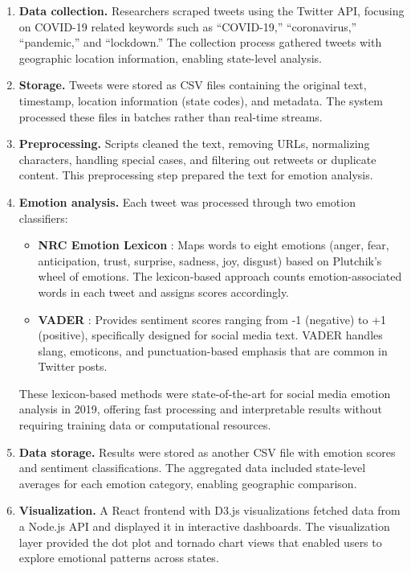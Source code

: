 \begin{enumerate}
\item \textbf{Data collection.} Researchers scraped tweets using the Twitter API, focusing on COVID-19 related keywords such as ``COVID-19,'' ``coronavirus,'' ``pandemic,'' and ``lockdown.'' The collection process gathered tweets with geographic location information, enabling state-level analysis.

\item \textbf{Storage.} Tweets were stored as CSV files containing the original text, timestamp, location information (state codes), and metadata. The system processed these files in batches rather than real-time streams.

\item \textbf{Preprocessing.} Scripts cleaned the text, removing URLs, normalizing characters, handling special cases, and filtering out retweets or duplicate content. This preprocessing step prepared the text for emotion analysis.

\item \textbf{Emotion analysis.} Each tweet was processed through two emotion classifiers:
\begin{itemize}
\item \textbf{NRC Emotion Lexicon} \cite{mohammad2013nrc}: Maps words to eight emotions (anger, fear, anticipation, trust, surprise, sadness, joy, disgust) based on Plutchik's wheel of emotions. The lexicon-based approach counts emotion-associated words in each tweet and assigns scores accordingly.
\item \textbf{VADER} \cite{hutto2014vader}: Provides sentiment scores ranging from -1 (negative) to +1 (positive), specifically designed for social media text. VADER handles slang, emoticons, and punctuation-based emphasis that are common in Twitter posts.
\end{itemize}

These lexicon-based methods were state-of-the-art for social media emotion analysis in 2019, offering fast processing and interpretable results without requiring training data or computational resources.

\item \textbf{Data storage.} Results were stored as another CSV file with emotion scores and sentiment classifications. The aggregated data included state-level averages for each emotion category, enabling geographic comparison.

\item \textbf{Visualization.} A React frontend with D3.js visualizations fetched data from a Node.js API and displayed it in interactive dashboards. The visualization layer provided the dot plot and tornado chart views that enabled users to explore emotional patterns across states.
\end{enumerate}

